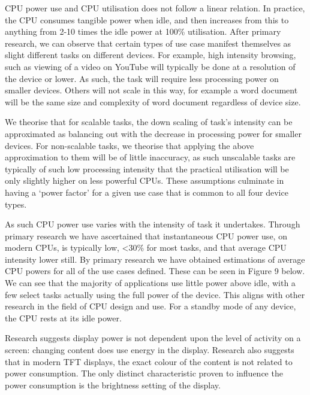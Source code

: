 \documentclass[conference]{IEEEtran}
\begin{document}

CPU power use and CPU utilisation does not follow a linear
relation. In practice, the CPU consumes tangible power when idle, and
then increases from this to anything from 2-10 times the idle power at
100\% utilisation.  After primary research, we can observe that
certain types of use case manifest themselves as slight different
tasks on different devices. For example, high intensity browsing, such
as viewing of a video on YouTube will typically be done at a
resolution of the device or lower. As such, the task will require less
processing power on smaller devices. Others will not scale in this
way, for example a word document will be the same size and complexity
of word document regardless of device size.

We theorise that for scalable tasks, the down scaling of task’s
intensity can be approximated as balancing out with the decrease in
processing power for smaller devices. For non-scalable tasks, we
theorise that applying the above approximation to them will be of
little inaccuracy, as such unscalable tasks are typically of such low
processing intensity that the practical utilisation will be only
slightly higher on less powerful CPUs.  These assumptions culminate in
having a ‘power factor’ for a given use case that is common to all
four device types.

As such CPU power use varies with the intensity of task it
undertakes. Through primary research we have ascertained that
instantaneous CPU power use, on modern CPUs, is typically low, <30\%
for most tasks, and that average CPU intensity lower still. By primary
research we have obtained estimations of average CPU powers for all of
the use cases defined. These can be seen in Figure 9 below. We can see
that the majority of applications use little power above idle, with a
few select tasks actually using the full power of the device. This
aligns with other research in the field of CPU design and use. For a
standby mode of any device, the CPU rests at its idle power.


Research suggests display power is not dependent upon the level of
activity on a screen: changing content does use energy in the
display. Research also suggests that in modern TFT displays, the exact
colour of the content is not related to power consumption. The only
distinct characteristic proven to influence the power consumption is
the brightness setting of the display.
\end{document}
